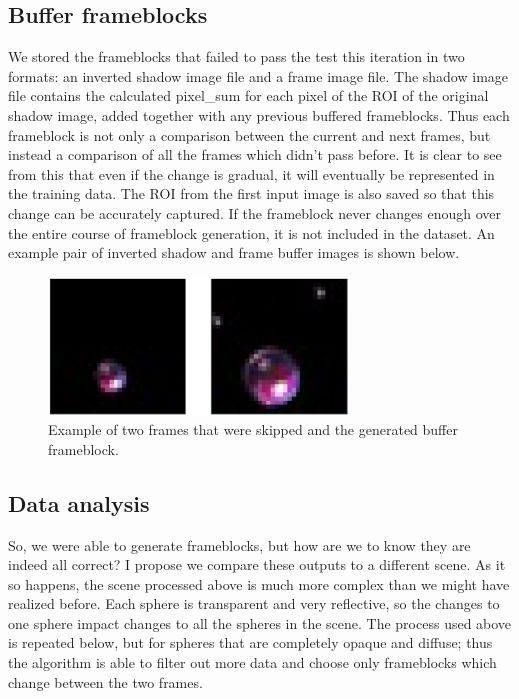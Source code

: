 \documentclass[conference]{IEEEtran}
\begin{document}
\subsection{Buffer frameblocks}
\label{subsec:buffer_frameblocks}
We stored the frameblocks that failed to pass the test this iteration in two formats:
an inverted shadow image file and a frame image file.
The shadow image file contains the calculated pixel\_sum for each pixel of the ROI of the original shadow image,
added together with any previous buffered frameblocks.
Thus each frameblock is not only a comparison between the current and next frames,
but instead a comparison of all the frames which didn't pass before.
It is clear to see from this that even if the change is gradual,
it will eventually be represented in the training data.
The ROI from the first input image is also saved so that this change can be accurately captured.
If the frameblock never changes enough over the entire course of frameblock generation,
it is not included in the dataset.
An example pair of inverted shadow and frame buffer images is shown below.

\begin{figure}[htbp]
\centerline{\includegraphics[width=8cm]{frameblock_pair.png}}
\caption{Example of two frames that were skipped and the generated buffer frameblock.}
\label{fig:frameblock_pair}
\end{figure}

\subsection{Data analysis}
\label{subsec:data_analysis}
So, we were able to generate frameblocks, but how are we to know they are indeed all correct?
I propose we compare these outputs to a different scene.
As it so happens, the scene processed above is much more complex than we might have realized before.
Each sphere is transparent and very reflective,
so the changes to one sphere impact changes to all the spheres in the scene.
The process used above is repeated below, but for spheres that are completely opaque and diffuse;
thus the algorithm is able to filter out more data and choose only frameblocks which change between the two frames.
\end{document}
